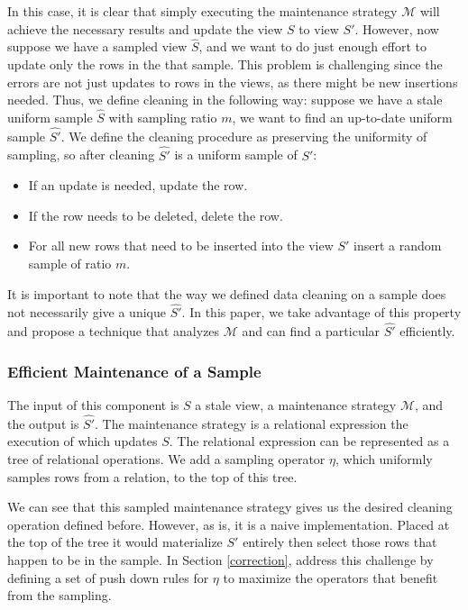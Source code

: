 In this case, it is clear that simply executing the maintenance strategy $\mathcal{M}$ will achieve the necessary results and update the view $S$ to view $S'$.
However, now suppose we have a sampled view $\hat{S}$, and we want to do just enough effort to update only the rows in the that sample.
This problem is challenging since the errors are not just updates to rows in the views, as there might be new insertions needed.
Thus, we define cleaning in the following way: suppose we have a stale uniform sample $\hat{S}$ with sampling ratio $m$, we want to find an up-to-date uniform sample $\hat{S'}$.
We define the cleaning procedure as preserving the uniformity of sampling, so after cleaning $\hat{S'}$ is a uniform sample of $S'$:
\begin{itemize}
\item If an update is needed, update the row.
\item If the row needs to be deleted, delete the row.
\item For all new rows that need to be inserted into the view $S'$ insert a random sample of ratio $m$.
\end{itemize}
It is important to note that the way we defined data cleaning on a sample does not necessarily give a unique $\hat{S'}$. 
In this paper, we take advantage of this property and propose a technique that analyzes $\mathcal{M}$ and can find a particular $\hat{S'}$
efficiently.

\subsubsection{Efficient Maintenance of a Sample}

The input of this component is $S$ a stale view, a maintenance strategy $\mathcal{M}$, and the output is $\hat{S'}$.
The maintenance strategy is a relational expression the execution of which updates $S$.
The relational expression can be represented as a tree of relational operations. 
We add a sampling operator $\eta$, which uniformly samples rows from a relation, to the top of this tree.

We can see that this sampled maintenance strategy gives us the desired cleaning operation defined before.
However, as is, it is a naive implementation.
Placed at the top of the tree it would materialize $S'$ entirely then select those rows that happen to be in the sample.
In Section \ref{correction}, address this challenge by defining a set of push down rules for $\eta$ to maximize the operators that benefit from the sampling.

